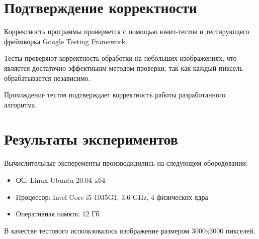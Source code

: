 \documentclass{report}
\begin{document}
\section*{Подтверждение корректности}
Корректность программы проверяется с помощью юнит-тестов и тестирующего фреймворка Google Testing Framework.

Тесты проверяют корректность обработки на небольших изображениях, что является достаточно эффектиынм методом проверки, так как каждый пиксель обрабатывается независимо.

Прохождение тестов подтверждает корректность работы разработанного алгоритма.
\newpage

\section*{Результаты экспериментов}

Вычислительные эксперементы производидились на следующем обородовании:

\begin{itemize}
    \item ОС: Linux Ubuntu 20.04 x64
    \item Процессор: Intel Core i5-1035G1, 3.6 GHz, 4 физических ядра
    \item Оперативная память: 12 Гб
\end{itemize}

В качестве тестового использовалось изображение размером 3000x3000 пикселей.

\end{document}
